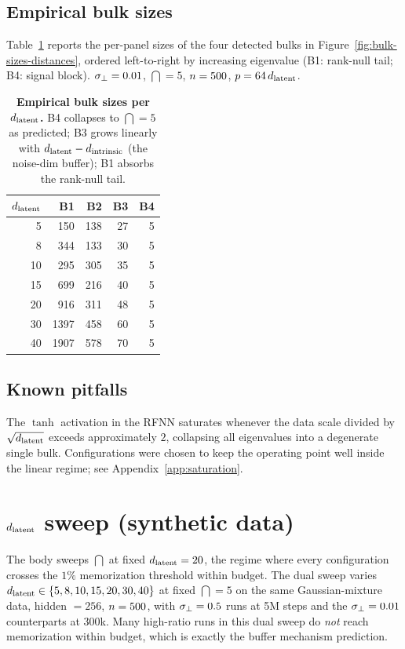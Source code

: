 \subsection{Empirical bulk sizes}
\label{app:bulk-sizes}
Table~\ref{tab:bulk-sizes} reports the per-panel sizes of the four
detected bulks in Figure~\ref{fig:bulk-sizes-distances}, ordered
left-to-right by increasing eigenvalue (B1: rank-null tail; B4:
signal block). $\sigma_{\perp} = 0.01$, $\dint = 5$, $n = 500$,
$p = 64\,d_{\mathrm{latent}}$.

\begin{table}[!t]
\centering\small
\setlength{\tabcolsep}{6pt}
\caption{\textbf{Empirical bulk sizes per $d_{\mathrm{latent}}$.} B4 collapses to
$\dint = 5$ as predicted; B3 grows linearly with $d_{\mathrm{latent}} - d_{\mathrm{intrinsic}}$
(the noise-dim buffer); B1 absorbs the rank-null tail.}
\label{tab:bulk-sizes}
\begin{tabular}{@{}rrrrr@{}}
\toprule
$d_{\mathrm{latent}}$ & B1 & B2 & B3 & B4 \\
\midrule
5  & 150  & 138 & 27 & 5 \\
8  & 344  & 133 & 30 & 5 \\
10 & 295  & 305 & 35 & 5 \\
15 & 699  & 216 & 40 & 5 \\
20 & 916  & 311 & 48 & 5 \\
30 & 1397 & 458 & 60 & 5 \\
40 & 1907 & 578 & 70 & 5 \\
\bottomrule
\end{tabular}
\end{table}

\subsection{Known pitfalls}
The $\tanh$ activation in the RFNN saturates whenever the data scale
divided by $\sqrt{d_{\mathrm{latent}}}$ exceeds approximately $2$, collapsing all
eigenvalues into a degenerate single bulk. Configurations were chosen to
keep the operating point well inside the linear regime; see
Appendix~\ref{app:saturation}.


\section{$d_{\mathrm{latent}}$ sweep (synthetic data)}
\label{app:mlp-dlat-sweep}

The body sweeps $\dint$ at fixed $d_{\mathrm{latent}} = 20$, the regime where
every configuration crosses the $1\%$ memorization threshold within
budget. The dual sweep varies $d_{\mathrm{latent}} \in \{5, 8, 10, 15, 20, 30,
40\}$ at fixed $\dint = 5$ on the same Gaussian-mixture data,
hidden $= 256$, $n = 500$, with $\sigma_{\perp} = 0.5$ runs at 5M
steps and the $\sigma_{\perp} = 0.01$ counterparts at 300k. Many
high-ratio runs in this dual sweep do \emph{not} reach memorization
within budget, which is exactly the buffer mechanism prediction.

